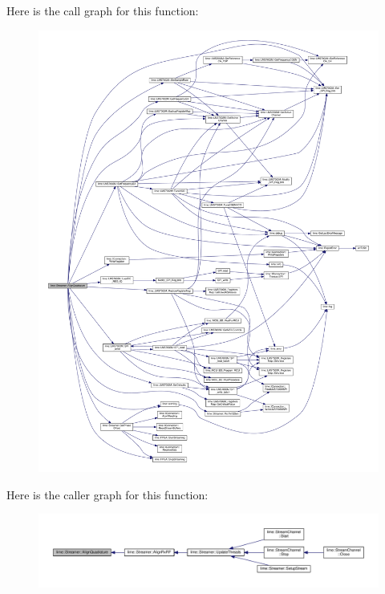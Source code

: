 Here is the call graph for this function\+:
\nopagebreak
\begin{figure}[H]
\begin{center}
\leavevmode
\includegraphics[width=350pt]{d9/d5d/classlime_1_1Streamer_a44a390ff3b22aabf1c112ba0f13a9e7f_cgraph}
\end{center}
\end{figure}




Here is the caller graph for this function\+:
\nopagebreak
\begin{figure}[H]
\begin{center}
\leavevmode
\includegraphics[width=350pt]{d9/d5d/classlime_1_1Streamer_a44a390ff3b22aabf1c112ba0f13a9e7f_icgraph}
\end{center}
\end{figure}



